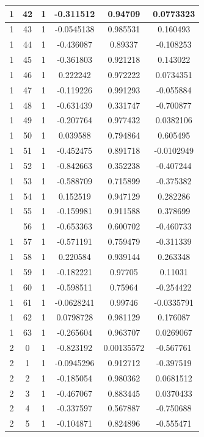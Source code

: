 \documentclass[12pt,a4paper]{article}
\numberwithin{equation}{section}
\numberwithin{figure}{section}
\numberwithin{table}{section}
\begin{document}
\begin{longtable}{|c|c|c|c|c|c|}
1 & 42 & 1 & -0.311512 & 0.94709 & 0.0773323 \\ \hline
1 & 43 & 1 & -0.0545138 & 0.985531 & 0.160493 \\ \hline
1 & 44 & 1 & -0.436087 & 0.89337 & -0.108253 \\ \hline
1 & 45 & 1 & -0.361803 & 0.921218 & 0.143022 \\ \hline
1 & 46 & 1 & 0.222242 & 0.972222 & 0.0734351 \\ \hline
1 & 47 & 1 & -0.119226 & 0.991293 & -0.055884 \\ \hline
1 & 48 & 1 & -0.631439 & 0.331747 & -0.700877 \\ \hline
1 & 49 & 1 & -0.207764 & 0.977432 & 0.0382106 \\ \hline
1 & 50 & 1 & 0.039588 & 0.794864 & 0.605495 \\ \hline
1 & 51 & 1 & -0.452475 & 0.891718 & -0.0102949 \\ \hline
1 & 52 & 1 & -0.842663 & 0.352238 & -0.407244 \\ \hline
1 & 53 & 1 & -0.588709 & 0.715899 & -0.375382 \\ \hline
1 & 54 & 1 & 0.152519 & 0.947129 & 0.282286 \\ \hline
1 & 55 & 1 & -0.159981 & 0.911588 & 0.378699 \\ \hline
\pagebreak
1 & 56 & 1 & -0.653363 & 0.600702 & -0.460733 \\ \hline
1 & 57 & 1 & -0.571191 & 0.759479 & -0.311339 \\ \hline
1 & 58 & 1 & 0.220584 & 0.939144 & 0.263348 \\ \hline
1 & 59 & 1 & -0.182221 & 0.97705 & 0.11031 \\ \hline
1 & 60 & 1 & -0.598511 & 0.75964 & -0.254422 \\ \hline
1 & 61 & 1 & -0.0628241 & 0.99746 & -0.0335791 \\ \hline
1 & 62 & 1 & 0.0798728 & 0.981129 & 0.176087 \\ \hline
1 & 63 & 1 & -0.265604 & 0.963707 & 0.0269067 \\ \hline
2 & 0 & 1 & -0.823192 & 0.00135572 & -0.567761 \\ \hline
2 & 1 & 1 & -0.0945296 & 0.912712 & -0.397519 \\ \hline
2 & 2 & 1 & -0.185054 & 0.980362 & 0.0681512 \\ \hline
2 & 3 & 1 & -0.467067 & 0.883445 & 0.0370433 \\ \hline
2 & 4 & 1 & -0.337597 & 0.567887 & -0.750688 \\ \hline
2 & 5 & 1 & -0.104871 & 0.824896 & -0.555471 \\ \hline

\end{longtable}
\end{document}
